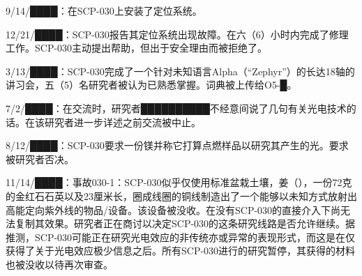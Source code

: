 9\slash 14\slash ████：在SCP-030上安装了定位系统。

12\slash 21\slash ████：SCP-030报告其定位系统出现故障。在六（6）小时内完成了修理工作。SCP-030主动提出帮助，但出于安全理由而被拒绝了。

3\slash 13\slash ████：SCP-030完成了一个针对未知语言Alpha（“Zephyr”）的长达18轴的讲习会，五（5）名研究者被认为已熟悉掌握。词典被上传给O5-█。

7\slash 2\slash ████：在交流时，研究者██████████不经意间说了几句有关光电技术的话。在该研究者进一步详述之前交流被中止。

8\slash 12\slash ████：SCP-030要求一份镁并称它打算点燃样品以研究其产生的光。要求被研究者否决。

11\slash 14\slash ████：事故030-1：SCP-030似乎仅使用标准盆栽土壤，姜（），一份72克的金红石石英以及23厘米长，圈成线圈的铜线制造出了一个能够以未知方式放射出高能定向紫外线的物品\slash 设备。该设备被没收。在没有SCP-030的直接介入下尚无法复制其效果。研究者正在商讨以决定SCP-030的这条研究线路是否允许继续。据推测，SCP-030可能正在研究光电效应的非传统亦或异常的表现形式，而这是在仅获得了关于光电效应极少信息之后。所有SCP-030进行的研究暂停，其获得的材料也被没收以待再次审查。

